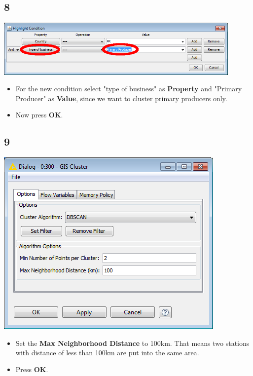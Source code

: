 \documentclass{beamer}
\begin{document}
\subsection{8}
\begin{frame}
	\begin{center}
  		\includegraphics[width=0.9\textwidth]{8.png}
	\end{center}
	\begin{itemize}
		\item For the new condition select "type of business" as \textbf{Property} and "Primary Producer" as \textbf{Value}, since we want to cluster primary producers only.
		\item Now press \textbf{OK}.
	\end{itemize}
\end{frame}

\subsection{9}
\begin{frame}
	\begin{center}
  		\includegraphics[height=0.6\textheight]{9.png}
	\end{center}
	\begin{itemize}
		\item Set the \textbf{Max Neighborhood Distance} to 100km. That means two stations with distance of less than 100km are put into the same area.
		\item Press \textbf{OK}.
	\end{itemize}
\end{frame}
\end{document}
